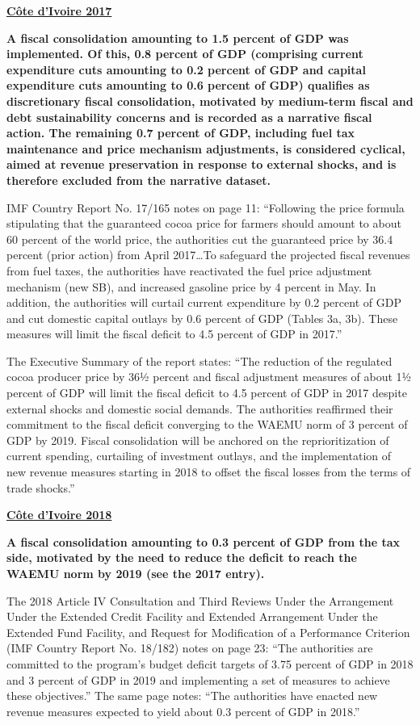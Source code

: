 \textbf{\underline{Côte d'Ivoire 2017}}

\textbf{A fiscal consolidation amounting to 1.5 percent of GDP was implemented. Of this, 0.8 percent of GDP (comprising  current expenditure cuts amounting to 0.2 percent of GDP and capital expenditure cuts amounting to 0.6 percent of GDP) qualifies as discretionary fiscal consolidation, motivated by medium-term fiscal and debt sustainability concerns and is recorded as a narrative fiscal action. The remaining 0.7 percent of GDP, including fuel tax maintenance and price mechanism adjustments, is considered cyclical, aimed at revenue preservation in response to external shocks, and is therefore excluded from the narrative dataset.}

IMF Country Report No. 17/165 notes on page 11: “Following the price formula stipulating that the guaranteed cocoa price for farmers should amount to about 60 percent of the world price, the authorities cut the guaranteed price by 36.4 percent (prior action) from April 2017…To safeguard the projected fiscal revenues from fuel taxes, the authorities have reactivated the fuel price adjustment mechanism (new SB), and increased gasoline price by 4 percent in May. In addition, the authorities will curtail current expenditure by 0.2 percent of GDP and cut domestic capital outlays by 0.6 percent of GDP (Tables 3a, 3b). These measures will limit the fiscal deficit to 4.5 percent of GDP in 2017.”

The Executive Summary of the report states: “The reduction of the regulated cocoa producer price by 36½ percent and fiscal adjustment measures of about 1½ percent of GDP will limit the fiscal deficit to 4.5 percent of GDP in 2017 despite external shocks and domestic social demands. The authorities reaffirmed their commitment to the fiscal deficit converging to the WAEMU norm of 3 percent of GDP by 2019. Fiscal consolidation will be anchored on the reprioritization of current spending, curtailing of investment outlays, and the implementation of new revenue measures starting in 2018 to offset the fiscal losses from the terms of trade shocks.”

\textbf{\underline{Côte d'Ivoire 2018}}

\textbf{A fiscal consolidation amounting to 0.3 percent of GDP from the tax side, motivated by the need to reduce the deficit to reach the WAEMU norm by 2019 (see the 2017 entry).}

The 2018 Article IV Consultation and Third Reviews Under the Arrangement Under the Extended Credit Facility and Extended Arrangement Under the Extended Fund Facility, and Request for Modification of a Performance Criterion (IMF Country Report No. 18/182) notes on page 23: “The authorities are committed to the program’s budget deficit targets of 3.75 percent of GDP in 2018 and 3 percent of GDP in 2019 and implementing a set of measures to achieve these objectives.” The same page notes: “The authorities have enacted new revenue measures expected to yield about 0.3 percent of GDP in 2018.”

